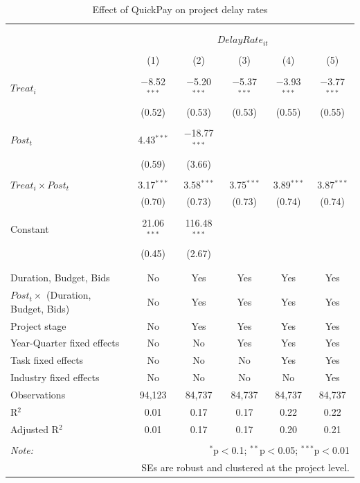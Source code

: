\documentclass[
]{article}
\begin{document}
\begin{table}[H] \centering 
  \caption{Effect of QuickPay on project delay rates} 
  \label{} 
\small 
\begin{tabular}{@{\extracolsep{-2pt}}lccccc} 
\\[-1.8ex]\hline 
\hline \\[-1.8ex] 
\\[-1.8ex] & \multicolumn{5}{c}{$DelayRate_{it}$} \\ 
\\[-1.8ex] & (1) & (2) & (3) & (4) & (5)\\ 
\hline \\[-1.8ex] 
 $Treat_i$ & $-$8.52$^{***}$ & $-$5.20$^{***}$ & $-$5.37$^{***}$ & $-$3.93$^{***}$ & $-$3.77$^{***}$ \\ 
  & (0.52) & (0.53) & (0.53) & (0.55) & (0.55) \\ 
  & & & & & \\ 
 $Post_t$ & 4.43$^{***}$ & $-$18.77$^{***}$ &  &  &  \\ 
  & (0.59) & (3.66) &  &  &  \\ 
  & & & & & \\ 
 $Treat_i \times Post_t$ & 3.17$^{***}$ & 3.58$^{***}$ & 3.75$^{***}$ & 3.89$^{***}$ & 3.87$^{***}$ \\ 
  & (0.70) & (0.73) & (0.73) & (0.74) & (0.74) \\ 
  & & & & & \\ 
 Constant & 21.06$^{***}$ & 116.48$^{***}$ &  &  &  \\ 
  & (0.45) & (2.67) &  &  &  \\ 
  & & & & & \\ 
\hline \\[-1.8ex] 
Duration, Budget, Bids & No & Yes & Yes & Yes & Yes \\ 
$Post_t \times$  (Duration, Budget, Bids) & No & Yes & Yes & Yes & Yes \\ 
Project stage & No & Yes & Yes & Yes & Yes \\ 
Year-Quarter fixed effects & No & No & Yes & Yes & Yes \\ 
Task fixed effects & No & No & No & Yes & Yes \\ 
Industry fixed effects & No & No & No & No & Yes \\ 
Observations & 94,123 & 84,737 & 84,737 & 84,737 & 84,737 \\ 
R$^{2}$ & 0.01 & 0.17 & 0.17 & 0.22 & 0.22 \\ 
Adjusted R$^{2}$ & 0.01 & 0.17 & 0.17 & 0.20 & 0.21 \\ 
\hline 
\hline \\[-1.8ex] 
\textit{Note:}  & \multicolumn{5}{r}{$^{*}$p$<$0.1; $^{**}$p$<$0.05; $^{***}$p$<$0.01} \\ 
 & \multicolumn{5}{r}{SEs are robust and clustered at the project level.} \\ 
\end{tabular} 
\end{table}
\end{document}
